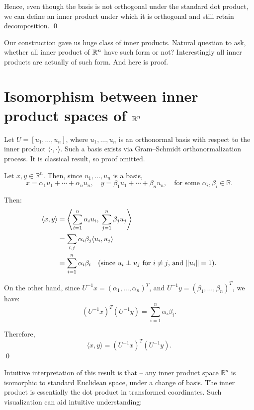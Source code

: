 \documentclass{article}
\begin{document}
Hence, even though the basis is not orthogonal under the standard dot product, we can define an inner product under which it is orthogonal and still retain decomposition. \qed

\bigskip

Our construction gave us huge class of inner products. Natural question to ask, whether all inner product of $\mathbb{R}^n$ have such form or not? Interestingly all inner products are actually of such form. And here is proof.

\section*{Isomorphism between inner product spaces of $\mathbb{R}^n$}

Let \( U = [u_1, \dots, u_n] \), where \( u_1, \dots, u_n \) is an orthonormal basis with respect to the inner product \( \langle \cdot, \cdot \rangle \). Such a basis exists via Gram–Schmidt orthonormalization process. It is classical result, so proof omitted.

Let \( x, y \in \mathbb{R}^n \). Then, since \( u_1, \dots, u_n \) is a basis,
\[
x = \alpha_1 u_1 + \cdots + \alpha_n u_n, \quad y = \beta_1 u_1 + \cdots + \beta_n u_n, \quad \text{for some } \alpha_i, \beta_i \in \mathbb{R}.
\]

Then:
\begin{align*}
\langle x, y \rangle &= \left\langle \sum_{i=1}^n \alpha_i u_i,\; \sum_{j=1}^n \beta_j u_j \right\rangle \\
&= \sum_{i,j} \alpha_i \beta_j \langle u_i, u_j \rangle \\
&= \sum_{i=1}^n \alpha_i \beta_i \quad \text{(since \( u_i \perp u_j \) for \( i \ne j \), and \( \|u_i\| = 1 \))}.
\end{align*}

On the other hand, since \( U^{-1} x = (\alpha_1, \dots, \alpha_n)^T \), and \( U^{-1} y = (\beta_1, \dots, \beta_n)^T \), we have:
\[
(U^{-1} x)^T (U^{-1} y) = \sum_{i=1}^n \alpha_i \beta_i.
\]

Therefore,
\[
\langle x, y \rangle = (U^{-1} x)^T (U^{-1} y).
\] \qed

Intuitive interpretation of this result is that -- any inner product space \( \mathbb{R}^n \) is isomorphic to standard Euclidean space, under a change of basis. The inner product is essentially the dot product in transformed coordinates. Such visualization can aid intuitive understanding:

\bigskip 
\end{document}
